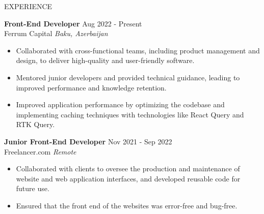 \documentclass{resume} %
\begin{document}
\begin{rSection}{EXPERIENCE}

\textbf{Front-End Developer} \hfill Aug 2022 - Present\\
Ferrum Capital \hfill \textit{Baku, Azerbaijan}
 \begin{itemize}
    \itemsep -3pt {} 
     \item Collaborated with cross-functional teams, including product management and design, to deliver high-quality and user-friendly software.
     \item Mentored junior developers and provided technical guidance, leading to improved performance and knowledge retention.
    \item Improved application performance by optimizing the codebase and implementing caching techniques with technologies like React Query and RTK Query. 
 \end{itemize}
 
\textbf{Junior Front-End Developer} \hfill Nov 2021 - Sep 2022\\
Freelancer.com \hfill \textit{Remote}
 \begin{itemize}
    \itemsep -3pt {} 
     \item Collaborated with clients to oversee the production and maintenance of website and web application interfaces, and developed reusable code for future use.
     \item Ensured that the front end of the websites was error-free and bug-free.
 \end{itemize}

\end{rSection} 

\end{document}
